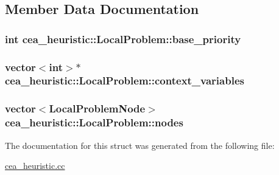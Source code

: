\subsection{Member Data Documentation}
\hypertarget{structcea__heuristic_1_1LocalProblem_a2a993fac180e0942b2e986cfbeb83d34}{
\subsubsection[{base\-\_\-priority}]{\setlength{\rightskip}{0pt plus 5cm}int cea\-\_\-heuristic\-::\-Local\-Problem\-::base\-\_\-priority}}\label{structcea__heuristic_1_1LocalProblem_a2a993fac180e0942b2e986cfbeb83d34}
\hypertarget{structcea__heuristic_1_1LocalProblem_a377d26ddd022f172bd5fe17c84376549}{
\subsubsection[{context\-\_\-variables}]{\setlength{\rightskip}{0pt plus 5cm}vector$<$int$>$$\ast$ cea\-\_\-heuristic\-::\-Local\-Problem\-::context\-\_\-variables}}\label{structcea__heuristic_1_1LocalProblem_a377d26ddd022f172bd5fe17c84376549}
\hypertarget{structcea__heuristic_1_1LocalProblem_ac2c8bf268b56b020babac230989e3025}{
\subsubsection[{nodes}]{\setlength{\rightskip}{0pt plus 5cm}vector$<${\bf Local\-Problem\-Node}$>$ cea\-\_\-heuristic\-::\-Local\-Problem\-::nodes}}\label{structcea__heuristic_1_1LocalProblem_ac2c8bf268b56b020babac230989e3025}


The documentation for this struct was generated from the following file\-:\begin{DoxyCompactItemize}
\item 
\hyperlink{cea__heuristic_8cc}{cea\-\_\-heuristic.\-cc}\end{DoxyCompactItemize}
